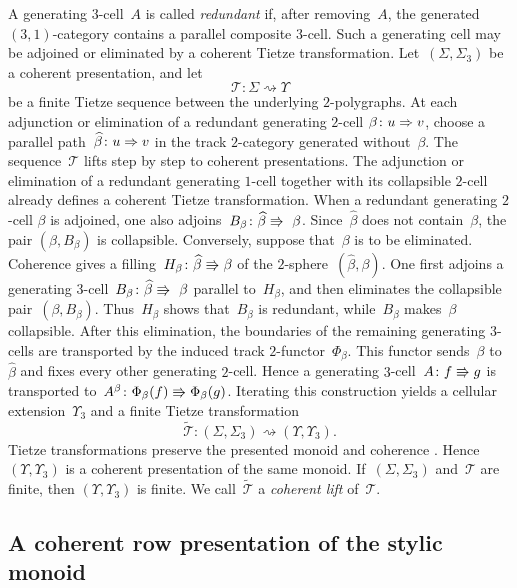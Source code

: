 \documentclass[a4paper, twoside, 11pt, english]{article}
\begin{document}
A generating $3$-cell~$A$ is called \emph{redundant} if, after removing~$A$, the generated $(3,1)$-category contains a parallel composite
$3$-cell. Such a generating cell may be adjoined or eliminated by a
coherent Tietze transformation.
Let~$(\Sigma,\Sigma_3)$ be a coherent presentation, and let
\[
\mathcal T\colon
\Sigma\rightsquigarrow\Upsilon
\]
be a finite Tietze sequence between the underlying $2$-polygraphs. At
each adjunction or elimination of a redundant generating $2$-cell
$\beta\colon u\Rightarrow v$, choose a parallel path~$\widehat\beta\colon u\Rightarrow v$
in the track $2$-category generated without~$\beta$.
The sequence~$\mathcal T$ lifts step by step to coherent
presentations. The adjunction or elimination of a redundant generating
$1$-cell together with its collapsible $2$-cell already defines a
coherent Tietze transformation. When a redundant generating $2$-cell
$\beta$ is adjoined, one also adjoins~$B_\beta\colon\widehat\beta\Rrightarrow~\beta$.
Since~$\widehat\beta$ does not contain~$\beta$, the pair
$(\beta,B_\beta)$ is collapsible.
Conversely, suppose that~$\beta$ is to be eliminated. Coherence gives
a filling~$H_\beta\colon\widehat\beta\Rrightarrow\beta$ of the $2$-sphere~$(\widehat\beta,\beta)$. One first adjoins a
generating $3$-cell~$B_\beta\colon\widehat\beta\Rrightarrow~\beta$ parallel to~$H_\beta$, and then eliminates the collapsible pair~$(\beta,B_\beta)$. Thus~$H_\beta$ shows that~$B_\beta$ is redundant,
while~$B_\beta$ makes~$\beta$ collapsible.
After this elimination, the boundaries of the remaining generating
$3$-cells are transported by the induced track $2$-functor~$\Phi_\beta$. This functor sends~$\beta$ to~$\widehat\beta$ and fixes every other generating $2$-cell. Hence a generating $3$-cell~$A\colon f\Rrightarrow g$ is transported to~$A^\beta\colon
\Phi_\beta(f)\Rrightarrow\Phi_\beta(g)$.
Iterating this construction yields a cellular extension~$\Upsilon_3$
and a finite Tietze transformation
\[
\widetilde{\mathcal T}\colon
(\Sigma,\Sigma_3)
\rightsquigarrow
(\Upsilon,\Upsilon_3).
\]
Tietze transformations preserve the presented monoid and coherence
\cite[Theorem~2.1.3]{GaussentGuiraudMalbos15}. Hence
$(\Upsilon,\Upsilon_3)$ is a coherent presentation of the same monoid.
If~$(\Sigma,\Sigma_3)$ and~$\mathcal T$ are finite, then
$(\Upsilon,\Upsilon_3)$ is finite. We call~$\widetilde{\mathcal T}$ a
\emph{coherent lift} of~$\mathcal T$.


\subsection{A coherent row presentation of the stylic monoid}
\label{SS:CoherentPresentationStylicMonoid}
\end{document}
